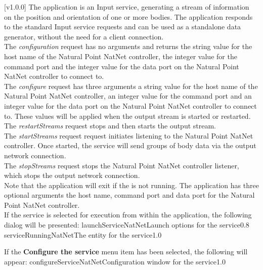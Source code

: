 [v1.0.0]
The  application is an Input service,
generating a stream of information on the position and orientation of one or more bodies.
The application responds to the standard Input service requests and can be used as a
standalone data generator, without the need for a client connection.\\

The \emph{configuration} request has no arguments and returns the string value for the
host name of the Natural Point NatNet controller, the integer value for the command port
and the integer value for the data port on the Natural Point NatNet controller to connect
to.\\

The \emph{configure} request has three arguments \longDash{} a string value for the host
name of the Natural Point NatNet controller, an integer value for the command port and an
integer value for the data port on the Natural Point NatNet controller to connect to.
These values will be applied when the output stream is started or restarted.\\ 

The \emph{restartStreams} request stops and then starts the output stream.\\

The \emph{startStreams} request request initiates listening to the Natural Point NatNet
controller.
Once started, the service will send groups of body data via the output \yarp{} network
connection.\\

The \emph{stopStreams} request stops the Natural Point NatNet controller listener, which
stops the output \yarp{} network connection.\\ 

Note that the application will exit if the \emph{\RS} is not running.
The application has three optional arguments \longDash{} the host name, command port and
data port for the Natural Point NatNet controller.
\insertAppParameters
\insertTagDescription{\NNI}
\insertInputServiceComment\\

\insertStandardServiceCommands
\secondaryEnd
{}
If the service is selected for execution from within the \emph{\MMMU} application, the
following dialog will be presented:
%
{launchServiceNatNet}{Launch options for the \emph{\NNI} service}{0.8}
\condPage
{}%
{serviceRunningNatNet}{The \emph{\MMMU} entity for the \emph{\NNI} service}{1.0}

If the \textbf{Configure the service} menu item has been selected, the following will
appear:
%
{configureServiceNatNet}{Configuration window for the \emph{\NNI} service}{1.0}
\secondaryEnd
\primaryEnd{}
